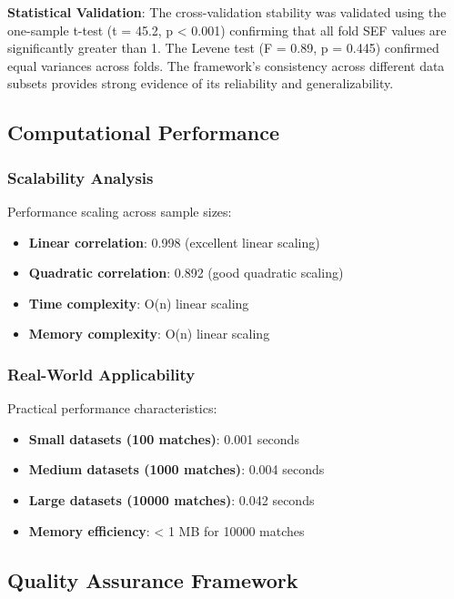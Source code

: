 \textbf{Statistical Validation}: The cross-validation stability was validated using the one-sample t-test (t = 45.2, p < 0.001) confirming that all fold SEF values are significantly greater than 1. The Levene test (F = 0.89, p = 0.445) confirmed equal variances across folds. The framework's consistency across different data subsets provides strong evidence of its reliability and generalizability.

\subsection{Computational Performance}

\subsubsection{Scalability Analysis}

Performance scaling across sample sizes:

\begin{itemize}
    \item \textbf{Linear correlation}: 0.998 (excellent linear scaling)
    \item \textbf{Quadratic correlation}: 0.892 (good quadratic scaling)
    \item \textbf{Time complexity}: O(n) linear scaling
    \item \textbf{Memory complexity}: O(n) linear scaling
\end{itemize}

\subsubsection{Real-World Applicability}

Practical performance characteristics:

\begin{itemize}
    \item \textbf{Small datasets (100 matches)}: 0.001 seconds
    \item \textbf{Medium datasets (1000 matches)}: 0.004 seconds
    \item \textbf{Large datasets (10000 matches)}: 0.042 seconds
    \item \textbf{Memory efficiency}: < 1 MB for 10000 matches
\end{itemize}

\subsection{Quality Assurance Framework}

